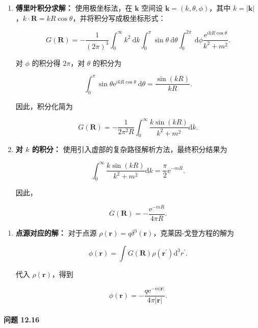\begin{enumerate}
\def\labelenumi{(\alph{enumi})}
\setcounter{enumi}{1}
\item
  \textbf{傅里叶积分求解：} 使用极坐标法，在 \(\mathbf{k}\) 空间设
  \(\mathbf{k} = (k,\theta,\phi)\)，其中
  \(k = \left| \mathbf{k} \right|\)，\(k \cdot \mathbf{R} = kR\cos\theta\)，并将积分写成极坐标形式：

  \[G\left( \mathbf{R} \right) = - \frac{1}{(2\pi)^{3}}\int_{0}^{\infty}k^{2}\mathrm{\: d}k\int_{0}^{\pi}\sin\theta\mathrm{\: d}\theta\int_{0}^{2\pi}\mathrm{\: d}\phi\frac{\mathrm{e}^{ikR\cos\theta}}{k^{2} + m^{2}}.\]

  对 \(\phi\) 的积分得 \(2\pi\)，对 \(\theta\) 的积分为

  \[\int_{0}^{\pi}\sin\theta\mathrm{e}^{ikR\cos\theta}\mathrm{\: d}\theta = \frac{\sin(kR)}{kR}.\]

  因此，积分化简为

  \[G\left( \mathbf{R} \right) = - \frac{1}{2\pi^{2}R}\int_{0}^{\infty}\frac{k\sin(kR)}{k^{2} + m^{2}}\mathrm{d}k.\]
\item
  \textbf{对 \(k\) 的积分：}
  使用引入虚部的复杂路径解析方法，最终积分结果为

  \[\int_{0}^{\infty}\frac{k\sin(kR)}{k^{2} + m^{2}}\mathrm{d}k = \frac{\pi}{2}\mathrm{e}^{- mR}.\]

  因此，

  \[G\left( \mathbf{R} \right) = - \frac{\mathrm{e}^{- mR}}{4\pi R}.\]
\end{enumerate}

\begin{enumerate}
\def\labelenumi{\arabic{enumi}.}
\setcounter{enumi}{2}
\item
  \textbf{点源对应的解：} 对于点源
  \(\rho\left( \mathbf{r} \right) = q\delta^{3}\left( \mathbf{r} \right)\)，克莱因-戈登方程的解为

  \[\phi\left( \mathbf{r} \right) = \int G\left( \mathbf{R} \right)\rho\left( \mathbf{r}^{\prime} \right)\mathrm{d}^{3}r^{\prime}.\]

  代入 \(\rho\left( \mathbf{r} \right)\)，得到

  \[\phi\left( \mathbf{r} \right) = - \frac{q\mathrm{e}^{- m\left| \mathbf{r} \right|}}{4\pi\left| \mathbf{r} \right|}.\]
\end{enumerate}

\paragraph{问题 12.16}\label{ux95eeux9898-12.16}

